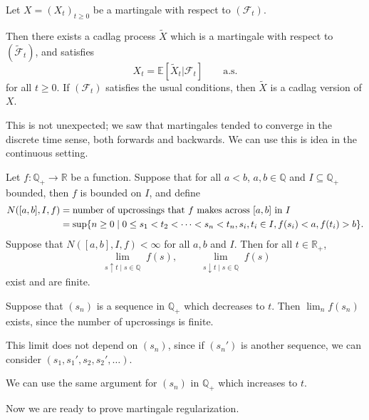 \documentclass[12pt]{article}
\begin{document}
\begin{theorem}
	Let $X = (X_t)_{t \geq 0}$ be a martingale with respect to $(\mathcal{F}_t)$.

	Then there exists a cadlag process $\tilde X$ which is a martingale with respect to $(\tilde{\mathcal{F}}_t)$, and satisfies
	\[
		X_t = \mathbb{E}[\tilde X_t | \mathcal{F}_t] \qquad \text{a.s.}
	\]
	for all $t \geq 0$. If $(\mathcal{F}_t)$ satisfies the usual conditions, then $\tilde X$ is a cadlag version of $X$.
\end{theorem}

This is not unexpected; we saw that martingales tended to converge in the discrete time sense, both forwards and backwards. We can use this is idea in the continuous setting.

\begin{lemma}
	Let $f : \mathbb{Q}_+ \to \mathbb{R}$ be a function. Suppose that for all $a < b$, $a, b \in \mathbb{Q}$ and $I \subseteq \mathbb{Q}_+$ bounded, then $f$ is bounded on $I$, and define
	\begin{align*}
		N([a, b], I, f) &= \text{\normalfont{number of upcrossings that $f$ makes across $[a, b]$ in $I$}} \\
				&= \sup\{n \geq 0 \mid 0 \leq s_1 < t_2 < \cdots < s_n < t_n, s_i, t_i \in I, f(s_i) < a, f(t_i) > b\}.
	\end{align*}
	Suppose that $N([a, b], I, f) < \infty$ for all $a, b$ and $I$. Then for all $t \in \mathbb{R}_+$,
	\[
		\lim_{\substack{s \uparrow t \mid s \in \mathbb{Q}}} f(s), \qquad \lim_{\substack{s \downarrow t \mid s \in \mathbb{Q}}} f(s)
	\]
	exist and are finite.
\end{lemma}

\begin{proofbox}
	Suppose that $(s_n)$ is a sequence in $\mathbb{Q}_+$ which decreases to $t$. Then $\lim_n f(s_n)$ exists, since the number of upcrossings is finite.

	This limit does not depend on $(s_n)$, since if $(s_n')$ is another sequence, we can consider $(s_1, s_1', s_2, s_2', \ldots)$.

	We can use the same argument for $(s_n)$ in $\mathbb{Q}_+$ which increases to $t$.
\end{proofbox}

Now we are ready to prove martingale regularization.
\end{document}
